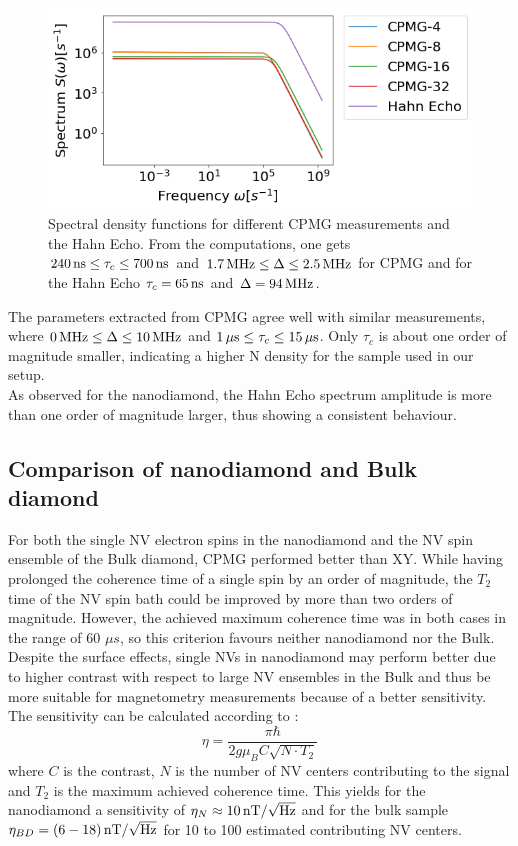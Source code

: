 \documentclass[12pt,a4paper]{article}
\begin{document}
\begin{figure}[H]
\centering
\includegraphics[scale=0.6]{bd12.pdf} 
\caption{Spectral density functions for different CPMG measurements and the Hahn Echo. From the computations, one gets $\unit[240]{ns}\leq\tau_c\leq\unit[700]{ns}$ and $\unit[1.7]{MHz}\leq\Delta\leq\unit[2.5]{MHz}$ for CPMG and for the Hahn Echo $\tau_c=\unit[65]{ns}$ and $\Delta=\unit[94]{MHz}$.}
\label{sb}
\end{figure}
The parameters extracted from CPMG agree well with similar measurements, where $\unit[0]{MHz}\leq\Delta\leq\unit[10]{MHz}$ and $\unit[1]{\mu s}\leq\tau_c\leq\unit[15]{\mu s}$. Only $\tau_c$ is about one order of magnitude smaller, indicating a higher N density for the sample used in our setup.\\
As observed for the nanodiamond, the Hahn Echo spectrum amplitude is more than one order of magnitude larger, thus showing a consistent behaviour.
\subsection{Comparison of nanodiamond and Bulk diamond}
For both the single NV electron spins in the nanodiamond and the NV spin ensemble of the Bulk diamond, CPMG performed better than XY. While having prolonged the coherence time of a single spin by an order of magnitude, the $T_2$ time of the NV spin bath could be improved by more than two orders of magnitude. However, the achieved maximum coherence time was in both cases in the range of 60 $\mu s$, so this criterion favours neither nanodiamond nor the Bulk. Despite the surface effects, single NVs in nanodiamond may perform better due to higher contrast with respect to large NV ensembles in the Bulk and thus be more suitable for magnetometry measurements because of a better sensitivity. The sensitivity can be calculated according to \cite{diss}:
\begin{equation}
\eta=\frac{\pi\hbar}{2 g\mu_B C\sqrt{N\cdot T_2}}
\end{equation}
where $C$ is the contrast, $N$ is the number of NV centers contributing to the signal and $T_2$ is the maximum achieved coherence time. This yields for the nanodiamond a sensitivity of $\eta_{N}\approx \unit[10]{nT/\sqrt{Hz}}$ and for the bulk sample $\eta_{BD}=\unit[(6-18)]{nT/\sqrt{Hz}}$ for 10 to 100 estimated contributing NV centers.
\newpage
\end{document}
